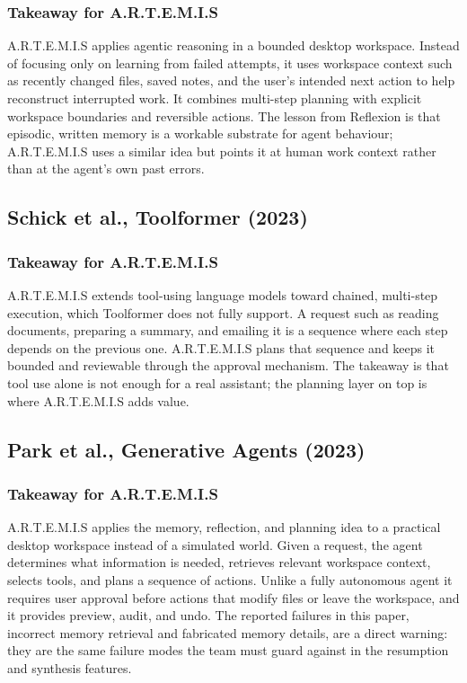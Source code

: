 \documentclass[11pt,a4paper]{report}
\newcommand{\artemis}{A.R.T.E.M.I.S}
\begin{document}
\subsubsection{Takeaway for \artemis{}}

\artemis{} applies agentic reasoning in a bounded desktop workspace.
Instead of focusing only on learning from failed attempts, it uses
workspace context such as recently changed files, saved notes, and the
user's intended next action to help reconstruct interrupted work. It
combines multi-step planning with explicit workspace boundaries and
reversible actions. The lesson from Reflexion is that episodic,
written memory is a workable substrate for agent behaviour; \artemis{}
uses a similar idea but points it at human work context rather than at
the agent's own past errors.

\subsection{Schick et al., Toolformer (2023)}

\subsubsection{Takeaway for \artemis{}}

\artemis{} extends tool-using language models toward chained,
multi-step execution, which Toolformer does not fully support. A request
such as reading documents, preparing a summary, and emailing it is a
sequence where each step depends on the previous one. \artemis{} plans
that sequence and keeps it bounded and reviewable through the approval
mechanism. The takeaway is that tool use alone is not enough for a real
assistant; the planning layer on top is where \artemis{} adds value.

\subsection{Park et al., Generative Agents (2023)}

\subsubsection{Takeaway for \artemis{}}

\artemis{} applies the memory, reflection, and planning idea to a
practical desktop workspace instead of a simulated world. Given a
request, the agent determines what information is needed, retrieves
relevant workspace context, selects tools, and plans a sequence of
actions. Unlike a fully autonomous agent it requires user approval
before actions that modify files or leave the workspace, and it
provides preview, audit, and undo. The reported failures in this paper,
incorrect memory retrieval and fabricated memory details, are a direct
warning: they are the same failure modes the team must guard against in
the resumption and synthesis features.
\end{document}
